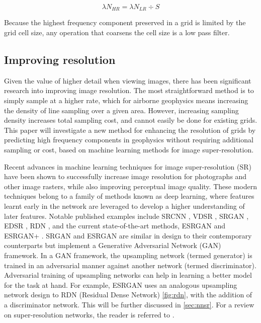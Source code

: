 \documentclass[manuscript.tex]{subfiles}
\begin{document}
\begin{equation}
    \label{eqn:hrn}
    \lambda{}N_{HR} = \lambda{}N_{LR} \div{}S
\end{equation}

Because the highest frequency component preserved in a grid is limited by the grid cell size, any operation that coarsens the cell size is a low pass filter.

\subsection{Improving resolution}
Given the value of higher detail when viewing images, there has been significant research into improving image resolution.
The most straightforward method is to simply sample at a higher rate, which for airborne geophysics means increasing the density of line sampling over a given area.
However, increasing sampling density increases total sampling cost, and cannot easily be done for existing grids.
This paper will investigate a new method for enhancing the resolution of grids by predicting high frequency components in geophysics without requiring additional sampling or cost, based on machine learning methods for image super-resolution.

Recent advances in machine learning techniques for image super-resolution (SR) have been shown to successfully increase image resolution for photographs and other image rasters, while also improving perceptual image quality.
These modern techniques belong to a family of methods known as deep learning, where features learnt early in the network are leveraged to develop a higher understanding of later features.
Notable published examples include SRCNN \parencite{dongLearningDeepConvolutional2014}, VDSR \parencite{kimAccurateImageSuperresolution2016}, SRGAN \parencite{ledigPhotorealisticSingleImage2017}, EDSR \parencite{limEnhancedDeepResidual2017}, RDN \parencite{zhangResidualDenseNetwork2018}, and the current state-of-the-art methods, ESRGAN \parencite{wangESRGANEnhancedSuperresolution2018} and ESRGAN+ \parencite{rakotonirinaESRGANFurtherImproving2020}.
SRGAN and ESRGAN are similar in design to their contemporary counterparts but implement a Generative Adversarial Network (GAN) framework.
In a GAN framework, the upsampling network (termed generator) is trained in an adversarial manner against another network (termed discriminator).
Adversarial training of upsampling networks can help in learning a better model for the task at hand.
For example, ESRGAN uses an analogous upsampling network design to RDN (Residual Dense Network) \cref{fig:rdn}, with the addition of a discriminator network.
This will be further discussed in \cref{sec:nnsr}.
For a review on super-resolution networks, the reader is referred to \cite{anwarDeepJourneySuperresolution2020}.
\end{document}
